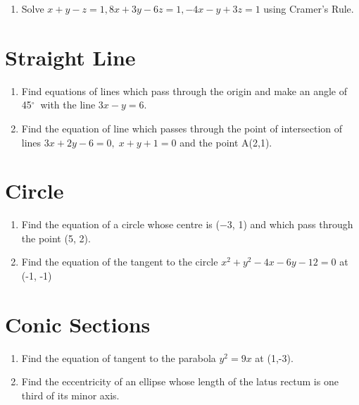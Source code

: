 \documentclass[14pt]{article}
\newcommand{\degree}{$^{\circ}\ $} %
\begin{document}
\begin{multicols}{2}
\begin{enumerate}
\item Solve $x +y - z = 1,  8x +3y - 6z = 1, -4x - y + 3z = 1$ using Cramer's Rule.
\end{enumerate} 

\section{Straight Line}
\noindent
\begin{enumerate}
\item Find equations of lines which pass
through the origin and make an angle of 45\degree
with the line $3x - y = 6.$

\item Find the equation of line which passes
	 through the point of intersection of lines
	 $3 x + 2 y - 6 = 0 ,\; x + y + 1 = 0$ and the point A(2,1).

\end{enumerate} 

\section{Circle}
\noindent
\begin{enumerate}

\item Find the equation of a circle whose centre is
(−3, 1) and which pass through the point (5, 2).

\item Find the equation of the tangent to the circle $x^2 + y^2 - 4x - 6y - 12 = 0$ at (-1, -1)

\end{enumerate} 

\section{Conic Sections}
\noindent
\begin{enumerate}
\item Find the equation of tangent to the parabola
$y^2 = 9x$ at (1,-3).

\item Find the eccentricity of an ellipse whose
length of the latus rectum is one third of its
minor axis.

\end{enumerate} 


\end{multicols}
\end{document}
